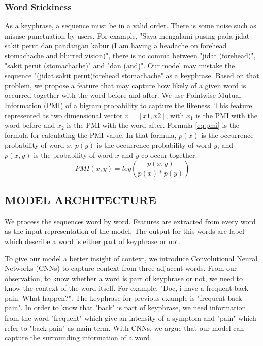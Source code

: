 \subsubsection{Word Stickiness\\}
As a keyphrase, a sequence must be in a valid order. There is some noise such as misuse punctuation by users. For example, "Saya mengalami pusing pada jidat sakit perut dan pandangan kabur (I am having a headache on forehead stomachache and blurred vision)", there is no comma between "jidat (forehead)", "sakit perut (stomachache)" and "dan (and)". Our model may mistake the sequence "(jidat sakit perut)forehead stomachache" as a keyphrase. Based on that problem, we propose a feature that may capture how likely of a given word is occurred together with the word before and after. We use Pointwise Mutual Information (PMI) of a bigram probability to capture the likeness. This feature represented as two dimensional vector $v = [x1, x2]$, with $x_1$ is the PMI with the word before and $x_2$ is the PMI with the word after. Formula \ref{eq:pmi} is the formula for calculating the PMI value. In that formula, $p(x)$ is the occurrence probability of word $x$, $p(y)$ is the occurrence probability of word $y$, and $p(x, y)$ is the probability of word $x$ and $y$ co-occur together.
\begin{equation}\label{eq:pmi}
	PMI(x,y)=log(\frac{p(x, y)}{p(x)*p(y)})
\end{equation} 
\subsection{MODEL ARCHITECTURE}
We process the sequences word by word. Features are extracted from every word as the input representation of the model. The output for this words are label which describe a word is either part of keyphrase or not.

To give our model a better insight of context, we introduce Convolutional Neural Networks (CNNs) to capture context from three adjacent words.  From our observation, to know whether a word is part of keyphrase or not, we need to know the context of the word itself. For example, "Doc, i have a frequent back pain. What happen?". The keyphrase for previous example is "frequent back pain". In order to know that "back" is part of keyphrase, we need information from the word "frequent" which give an intensity of a symptom and "pain" which refer to "back pain" as main term. With CNNs, we argue that our model can capture the surrounding information of a word.

